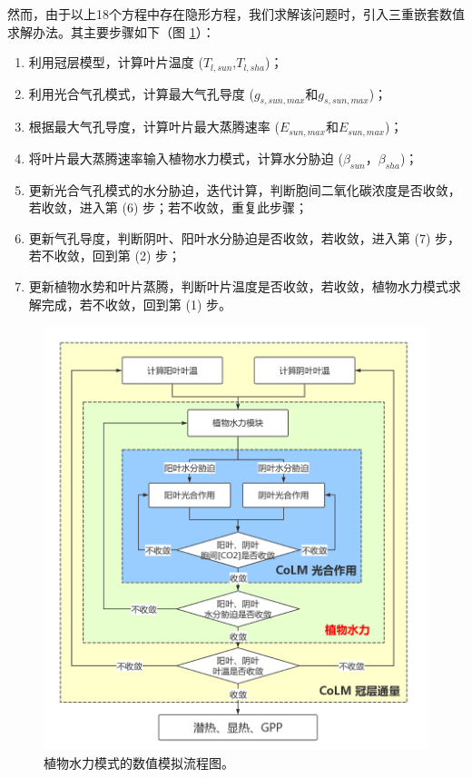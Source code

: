 然而，由于以上18个方程中存在隐形方程，我们求解该问题时，引入三重嵌套数值求解办法。其主要步骤如下（图 \ref{fig:植物水力模式的数值模拟流程图}）：
\begin{enumerate}
    \item 利用冠层模型，计算叶片温度 ($T_{l,sun}$,$T_{l,sha}$)；
    \item 利用光合气孔模式，计算最大气孔导度 ($g_{s,sun,max}$和$g_{s,sun,max}$)；
    \item 根据最大气孔导度，计算叶片最大蒸腾速率 ($E_{sun,max}$和$E_{sun,max}$)；
    \item 将叶片最大蒸腾速率输入植物水力模式，计算水分胁迫 ($\beta_{sun}$，$\beta_{sha}$)；
    \item 更新光合气孔模式的水分胁迫，迭代计算，判断胞间二氧化碳浓度是否收敛，若收敛，进入第 (6) 步；若不收敛，重复此步骤；
    \item 更新气孔导度，判断阴叶、阳叶水分胁迫是否收敛，若收敛，进入第 (7) 步，若不收敛，回到第 (2) 步；
    \item 更新植物水势和叶片蒸腾，判断叶片温度是否收敛，若收敛，植物水力模式求解完成，若不收敛，回到第 (1) 步。
\end{enumerate}

{
    \begin{figure}[]
    \centering
    \includegraphics{Figures/植被水力模式/植物水力模式的数值模拟流程图.png}
    \caption{植物水力模式的数值模拟流程图。}
    \label{fig:植物水力模式的数值模拟流程图}
    \end{figure}
    }

